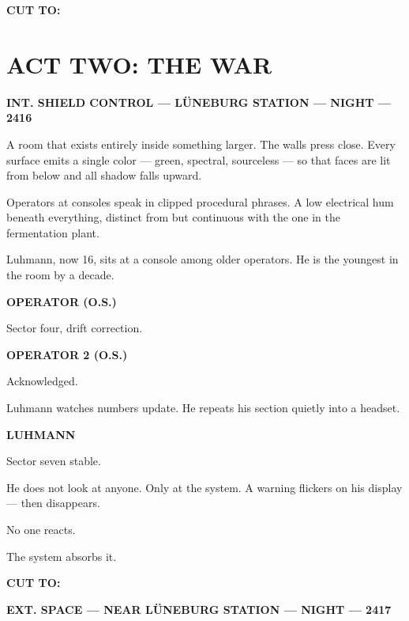 \documentclass[12pt]{article}
\newcommand{\sceneheading}[1]{%
  \vspace{10pt}%
  \noindent\textbf{#1}%
  \vspace{6pt}%
}
\newcommand{\trans}[1]{%
  \vspace{8pt}%
  \begin{flushright}\textbf{#1}\end{flushright}%
  \vspace{4pt}%
}
\newcommand{\character}[1]{%
  \vspace{8pt}%
  \begin{center}\textbf{#1}\end{center}%
  \vspace{-4pt}%
}
\newenvironment{dialogue}{%
  \begin{center}%
  \begin{minipage}{0.62\textwidth}%
}{%
  \end{minipage}%
  \end{center}%
  \vspace{4pt}%
}
\newenvironment{action}{%
  \vspace{4pt}%
  \noindent\ignorespaces%
}{%
  \vspace{6pt}%
}
\begin{document}
\trans{CUT TO:}


\section*{ACT TWO: THE WAR}

\sceneheading{INT. SHIELD CONTROL — LÜNEBURG STATION — NIGHT — 2416}

\begin{action}
A room that exists entirely inside something larger. The walls press close. Every surface emits a single color — green, spectral, sourceless — so that faces are lit from below and all shadow falls upward.

\medskip

Operators at consoles speak in clipped procedural phrases. A low electrical hum beneath everything, distinct from but continuous with the one in the fermentation plant.

\medskip

Luhmann, now 16, sits at a console among older operators. He is the youngest in the room by a decade.
\end{action}

\character{OPERATOR (O.S.)}
\begin{dialogue}
Sector four, drift correction.
\end{dialogue}

\character{OPERATOR 2 (O.S.)}
\begin{dialogue}
Acknowledged.
\end{dialogue}

\begin{action}
Luhmann watches numbers update. He repeats his section quietly into a headset.
\end{action}

\character{LUHMANN}
\begin{dialogue}
Sector seven stable.
\end{dialogue}

\begin{action}
He does not look at anyone. Only at the system. A warning flickers on his display — then disappears.

No one reacts.

The system absorbs it.
\end{action}

\trans{CUT TO:}

\sceneheading{EXT. SPACE — NEAR LÜNEBURG STATION — NIGHT — 2417}
\end{document}

